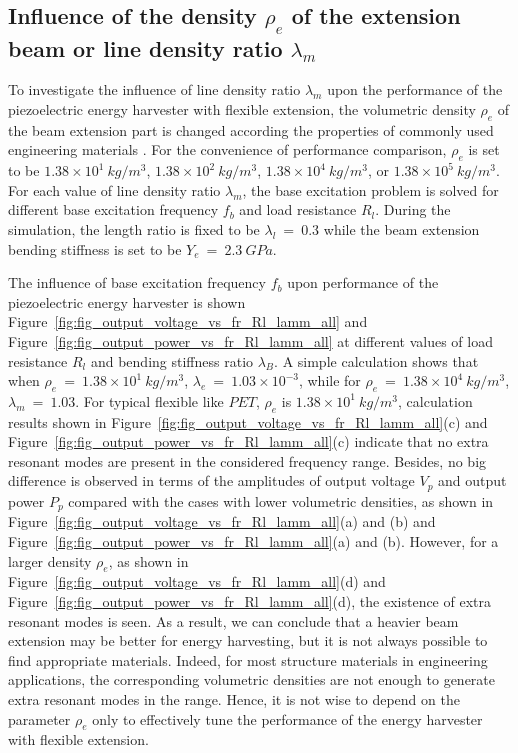\documentclass{elsarticle}
\begin{document}
\subsection{Influence of the density $\rho_e$ of the extension beam or line density ratio $\lambda_m$}

To investigate the influence of line density ratio $\lambda_m$ upon the performance of the piezoelectric energy harvester with flexible extension, the volumetric density $\rho_e$ of the beam extension part is changed according the properties of commonly used engineering materials \cite{warlimont2018springer}. For the convenience of performance comparison, $\rho_e$ is set to be $1.38\times10^1\ kg/m^3$, $1.38\times10^2\ kg/m^3$, $1.38\times10^4\ kg/m^3$, or $1.38\times10^5\ kg/m^3$. For each value of line density ratio $\lambda_m$, the base excitation problem is solved for different base excitation frequency $f_b$ and load resistance $R_l$. During the simulation, the length ratio is fixed to be $\lambda_l\ =\ 0.3$ while the beam extension bending stiffness is set to be $Y_e\ =\ 2.3\ GPa$.

The influence of base excitation frequency $f_b$ upon performance of the piezoelectric energy harvester is shown Figure~\ref{fig:fig_output_voltage_vs_fr_Rl_lamm_all} and Figure~\ref{fig:fig_output_power_vs_fr_Rl_lamm_all} at different values of load resistance $R_l$ and bending stiffness ratio $\lambda_B$. A simple calculation shows that when $\rho_e\ =\ 1.38\times10^1\ kg/m^3$, $\lambda_e\ =\ 1.03\times10^{-3}$, while for $\rho_e\ =\ 1.38\times10^4\ kg/m^3$, $\lambda_m\ =\ 1.03$. For typical flexible like $PET$\cite{dean1999lange}, $\rho_e$ is $1.38\times10^1\ kg/m^3$, calculation results shown in Figure~\ref{fig:fig_output_voltage_vs_fr_Rl_lamm_all}(c) and Figure~\ref{fig:fig_output_power_vs_fr_Rl_lamm_all}(c) indicate that no extra resonant modes are present in the considered frequency range. Besides, no big difference is observed in terms of the amplitudes of output voltage $V_p$ and output power $P_p$ compared with the cases with lower volumetric densities, as shown in Figure~\ref{fig:fig_output_voltage_vs_fr_Rl_lamm_all}(a) and (b) and Figure~\ref{fig:fig_output_power_vs_fr_Rl_lamm_all}(a) and (b). However, for a larger density $\rho_e$, as shown in Figure~\ref{fig:fig_output_voltage_vs_fr_Rl_lamm_all}(d) and Figure~\ref{fig:fig_output_power_vs_fr_Rl_lamm_all}(d), the existence of extra resonant modes is seen. As a result, we can conclude that a heavier beam extension may be better for energy harvesting, but it is not always possible to find appropriate materials. Indeed, for most structure materials in engineering applications, the corresponding volumetric densities are not enough to generate extra resonant modes in the range. Hence, it is not wise to depend on the parameter $\rho_e$ only to effectively tune the performance of the energy harvester with flexible extension. 
\end{document}
